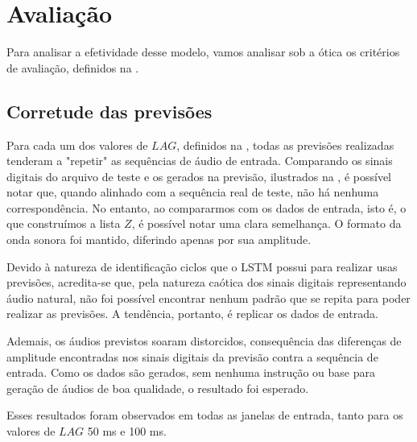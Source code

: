 \section{Avaliação}

Para analisar a efetividade desse modelo, vamos analisar sob a ótica os critérios de avaliação, definidos na .

\subsection{Corretude das previsões}

Para cada um dos valores de $LAG$, definidos na , todas as previsões realizadas tenderam a "repetir" as sequências de áudio de entrada. Comparando os sinais digitais do arquivo de teste e os gerados na previsão, ilustrados na , é possível notar que, quando alinhado com a sequência real de teste, não há nenhuma correspondência. No entanto, ao compararmos com os dados de entrada, isto é, o que construímos a lista $Z$, é possível notar uma clara semelhança. O formato da onda sonora foi mantido, diferindo apenas por sua amplitude.

Devido à natureza de identificação ciclos que o LSTM possui para realizar usas previsões, acredita-se que, pela natureza caótica dos sinais digitais representando áudio natural, não foi possível encontrar nenhum padrão que se repita para poder realizar as previsões. A tendência, portanto, é replicar os dados de entrada.

Ademais, os áudios previstos soaram distorcidos, consequência das diferenças de amplitude encontradas nos sinais digitais da previsão contra a sequência de entrada. Como os dados são gerados, sem nenhuma instrução ou base para geração de áudios de boa qualidade, o resultado foi esperado.

Esses resultados foram observados em todas as janelas de entrada, tanto para os valores de $LAG$ 50 ms e 100 ms.

